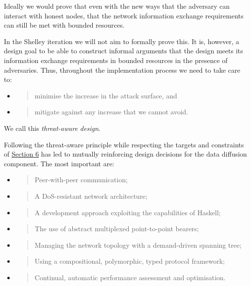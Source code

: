 \documentclass[11pt,a4paper]{article}
\begin{document}
Ideally we would prove that even with the new ways that the adversary
can interact with honest nodes, that the network information exchange
requirements can still be met with bounded resources.

In the Shelley iteration we will not aim to formally prove this. It is,
however, a design goal to be able to construct informal arguments that
the design meets its information exchange requirements in bounded
resources in the presence of adversaries. Thus, throughout the
implementation process we need to take care to:

\begin{itemize}
\item
  \begin{quote}
  minimise the increase in the attack surface, and
  \end{quote}
\item
  \begin{quote}
  mitigate against any increase that we cannot avoid.
  \end{quote}
\end{itemize}

We call this \emph{threat-aware design}.

Following the threat-aware principle while respecting the targets and
constraints of \protect\hyperlink{overview}{{Section 6}} has led to
mutually reinforcing design decisions for the data diffusion component.
The most important are:

\begin{itemize}
\item
  \begin{quote}
  Peer-with-peer communication;
  \end{quote}
\item
  \begin{quote}
  A DoS-resistant network architecture;
  \end{quote}
\item
  \begin{quote}
  A development approach exploiting the capabilities of Haskell;
  \end{quote}
\item
  \begin{quote}
  The use of abstract multiplexed point-to-point bearers;
  \end{quote}
\item
  \begin{quote}
  Managing the network topology with a demand-driven spanning tree;
  \end{quote}
\item
  \begin{quote}
  Using a compositional, polymorphic, typed protocol framework;
  \end{quote}
\item
  \begin{quote}
  Continual, automatic performance assessment and optimisation.
  \end{quote}
\end{itemize}
\end{document}
